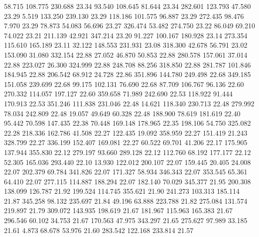   58.715  108.775  230.688        23.34
  93.540  108.645   81.644        23.34
 282.601  123.793   47.580        23.29
   5.519  133.250  239.130        23.29
 118.186  101.575   96.887        23.29
 272.435   98.476    7.970        23.29
  78.873   54.083   56.696        23.27
 326.474   53.482  274.750        23.22
  86.049   69.210   74.022        23.21
 211.139   42.921  347.214        23.20
  91.227  100.167  180.928        23.14
 273.354  115.610  165.189        23.11
  32.122  148.553  231.931        23.08
 318.300   42.678   56.791        23.02
 153.090   31.080  332.154        22.88
  27.052   46.870   50.853        22.88
 280.578  157.061   37.014        22.88
 223.027   26.300  324.999        22.88
 248.708   88.256  318.850        22.88
 281.787  101.846  184.945        22.88
 206.542   68.912   24.728        22.86
 351.896  144.780  249.498        22.68
 349.185  151.058  239.699        22.68
  99.175  102.131   76.690        22.68
  87.709  106.767   96.136        22.60
 270.332  114.057  197.127        22.60
 359.658   71.989  242.690        22.53
 118.922   91.444  170.913        22.53
 351.246  111.838  231.046        22.48
  14.621  118.340  230.713        22.48
 279.992   78.034  242.809        22.48
  19.057   49.649   60.328        22.48
 188.900   78.619  181.619        22.40
  95.442   70.598  147.435        22.38
  70.448  169.148  178.965        22.35
 198.106   54.750  325.082        22.28
 218.336  162.786   41.508        22.27
 122.435   19.092  358.959        22.27
 151.419   21.243  328.799        22.27
 336.199  152.407  169.081        22.27
  60.522   69.701   41.206        22.17
 175.905  137.944  355.830        22.12
 279.197   93.660  289.128        22.12
 112.760   68.192  177.177        22.12
  52.305  165.036  293.440        22.10
  13.930  122.012  200.107        22.07
 159.445   20.405   24.008        22.07
 202.379   69.784  341.826        22.07
 171.327   58.934  346.343        22.07
 353.545   65.361   64.410        22.07
 277.115  114.887  188.294        22.07
 182.140   70.029  345.377        21.95
 200.308  138.099  126.787        21.92
 199.524  114.745  355.621        21.90
 241.273  103.313  185.114        21.87
 345.258   98.132  235.697        21.84
  49.196   63.888  223.788        21.82
 275.084  131.574  219.897        21.79
 309.072  143.935  198.619        21.67
 181.967  115.963  165.383        21.67
 296.546   60.102   34.753        21.67
 170.563   47.975  343.297        21.65
 275.627   97.989   33.185        21.61
   4.873   68.678   53.976        21.60
 283.542  122.168  233.814        21.57
